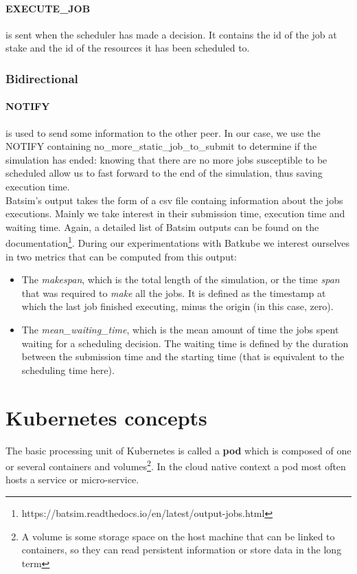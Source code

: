 \paragraph{EXECUTE\_JOB}
is sent when the scheduler has made a decision. It contains the id of the job
at stake and the id of the resources it has been scheduled to.

\subsubsection{Bidirectional}

\paragraph{NOTIFY}
is used to send some information to the other peer. In our case, we use the
NOTIFY containing no\_more\_static\_job\_to\_submit to determine if the
simulation has ended: knowing that there are no more jobs susceptible to be
scheduled allow us to fast forward to the end of the simulation, thus saving
execution time.\\

Batsim's output takes the form of a csv file containg information about the
jobs executions. Mainly we take interest in their submission time, execution
time and waiting time. Again, a detailed list of Batsim outputs can be found on
the
documentation\footnote{https://batsim.readthedocs.io/en/latest/output-jobs.html}.
During our experimentations with Batkube we interest ourselves in two metrics
that can be computed from this output:
\begin{itemize}
	\item The \textit{makespan}, which is the total length of the
		simulation, or the time \textit{span} that was required to
		\textit{make} all the jobs. It is defined as the timestamp at
		which the last job finished executing, minus the origin (in
		this case, zero).
	\item The \textit{mean\_waiting\_time}, which is the mean amount of
		time the jobs spent waiting for a scheduling decision. The
		waiting time is defined by the duration between the submission
		time and the starting time (that is equivalent to the
		scheduling time here).
\end{itemize}
\section{Kubernetes concepts}

The basic processing unit of Kubernetes is called a \textbf{pod} which is
composed of one or several containers and volumes\footnote{A volume is some
	storage space on the host machine that can be linked to containers, so
	they can read persistent information or store data in the long term}.
In the cloud native context a pod most often hosts a service or micro-service.


